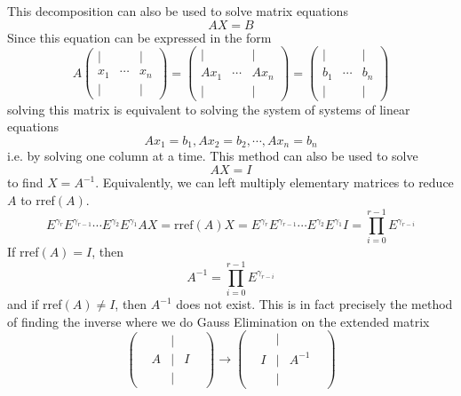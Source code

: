   This decomposition can also be used to solve matrix equations
  \begin{equation}
    A X = B
  \end{equation}
  Since this equation can be expressed in the form
  \begin{equation}
    A \begin{pmatrix}
    | & & | \\ x_1 & \cdots & x_n \\ | & & | 
    \end{pmatrix} = \begin{pmatrix}
    | & & | \\ A x_1 & \cdots & A x_n \\ | & & | 
    \end{pmatrix} = \begin{pmatrix}
    | & & | \\ b_1 & \cdots & b_n \\ | & & | 
    \end{pmatrix}
  \end{equation}
  solving this matrix is equivalent to solving the system of systems of linear equations 
  \begin{equation}
    Ax_1 = b_1, Ax_2 = b_2, \cdots, Ax_n = b_n
  \end{equation}
  i.e. by solving one column at a time. This method can also be used to solve 
  \begin{equation}
    A X = I
  \end{equation}
  to find $X = A^{-1}$. Equivalently, we can left multiply elementary matrices to reduce $A$ to rref$(A)$. 
  \begin{equation}
    E^{\gamma_r} E^{\gamma_{r-1}} \cdots E^{\gamma_2} E^{\gamma_1} A X = \text{rref}(A) X = E^{\gamma_r} E^{\gamma_{r-1}} \cdots E^{\gamma_2} E^{\gamma_1} I = \prod_{i = 0}^{r-1} E^{\gamma_{r-i}}
  \end{equation}
  If rref$(A)= I$, then 
  \begin{equation}
    A^{-1} = \prod_{i = 0}^{r-1} E^{\gamma_{r-i}}
  \end{equation}
  and if rref$(A) \neq I$, then $A^{-1}$ does not exist. This is in fact precisely the method of finding the inverse where we do Gauss Elimination on the extended matrix
  \begin{equation}
    \begin{pmatrix}
    & &| & & \\ & A &| & I & \\ & &| & & 
    \end{pmatrix} \longrightarrow \begin{pmatrix}
    & &| & & \\ & I &| & A^{-1} & \\ & &| & & 
    \end{pmatrix}
  \end{equation}

